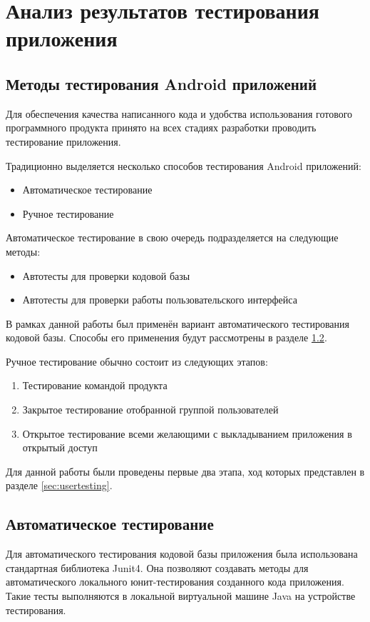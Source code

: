 \chapter{Анализ результатов тестирования приложения}
\section{Методы тестирования Android приложений}
Для обеспечения качества написанного кода и удобства использования готового программного продукта принято на всех стадиях разработки проводить тестирование приложения. 

Традиционно выделяется несколько способов тестирования Android приложений:
\begin{itemize}
	\item Автоматическое тестирование
	\item Ручное тестирование
\end{itemize}
\smallskip
Автоматическое тестирование в свою очередь подразделяется на следующие методы:
\begin{itemize}
	\item Автотесты для проверки кодовой базы
	\item Автотесты для проверки работы пользовательского интерфейса
\end{itemize}
\smallskip
В рамках данной работы был применён вариант автоматического тестирования кодовой базы. Способы его применения будут рассмотрены в разделе \ref{sec:autotesting}.

Ручное тестирование обычно состоит из следующих этапов:
\begin{enumerate}
	\item Тестирование командой продукта
	\item Закрытое тестирование отобранной группой пользователей
	\item Открытое тестирование всеми желающими с выкладыванием приложения в открытый доступ
\end{enumerate}
\smallskip
Для данной работы были проведены первые два этапа, ход которых представлен в разделе \ref{sec:usertesting}.

\section{Автоматическое тестирование}
\label{sec:autotesting}
Для автоматического тестирования кодовой базы приложения была использована стандартная библиотека Junit4. Она позволяют создавать методы для автоматического локального юнит-тестирования созданного кода приложения. Такие тесты выполняются в локальной виртуальной машине Java на устройстве тестирования.


